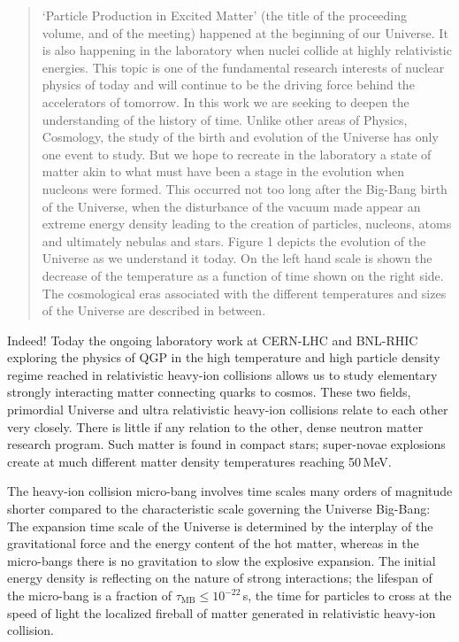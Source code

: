 \begin{quote}
`Particle Production in Excited Matter' (the title of the proceeding volume, and of the meeting) happened at the beginning of our Universe. It is also happening in the laboratory when nuclei collide at highly relativistic energies. This topic is one of the fundamental research interests of nuclear physics of today and will continue to be the driving force behind the accelerators of tomorrow. In this work we are seeking to deepen the understanding of the history of time. Unlike other areas of Physics, Cosmology, the study of the birth and evolution of the Universe has only one event to study. But we hope to recreate in the laboratory a state of matter akin to what must have been a stage in the evolution when nucleons were formed. This occurred not too long after the Big-Bang birth of the Universe, when the disturbance of the vacuum made appear an extreme energy density leading to the creation of particles, nucleons, atoms and ultimately nebulas and stars. Figure 1 depicts the evolution of the Universe as we understand it today. On the left hand scale is shown the decrease of the temperature as a function of time shown on the right side. The cosmological eras associated with the different temperatures and sizes of the Universe are described in between.
\end{quote}

Indeed! Today the ongoing laboratory work at CERN-LHC and BNL-RHIC exploring the physics of QGP in the high temperature and high particle density regime reached in relativistic heavy-ion collisions allows us to study elementary strongly interacting matter connecting quarks to cosmos. These two fields, primordial Universe and ultra relativistic heavy-ion collisions relate to each other very closely. There is little if any relation to the other, dense neutron matter research program. Such matter is found in compact stars; super-novae explosions create at much different matter density temperatures reaching 50\,MeV. 

The heavy-ion collision micro-bang involves time scales many orders of magnitude shorter compared to the characteristic scale governing the Universe Big-Bang: The expansion time scale of the Universe is determined by the interplay of the gravitational force and the energy content of the hot matter, whereas in the micro-bangs there is no gravitation to slow the explosive expansion. The initial energy density is reflecting on the nature of strong interactions; the lifespan of the micro-bang is a fraction of $\tau_\mathrm{MB}\le 10^{-22}$\,s, the time for particles to cross at the speed of light the localized fireball of matter generated in relativistic heavy-ion collision. 

